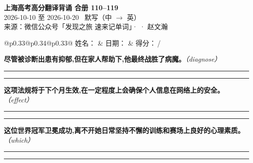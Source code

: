 \documentclass[11pt,a4paper]{article}
\newcommand{\num}[1]{\makebox[1.9em][r]{#1.}\hspace{0.3em}}
\newcommand{\wline}{\noindent\rule{\linewidth}{0.4pt}}
\newcommand{\prompt}[1]{\emph{\textcolor{tipblue}{\small（#1）}}}
\begin{document}
\pagestyle{plain}
\begin{center}
{\LARGE\bfseries 上海高考高分翻译背诵 \quad 合册 110–119}\\[0.25em]
{\large 2026-10-10 至 2026-10-20 \quad\ 默写（中 $\to$ 英）}\\[0.35em]
{\footnotesize 来源：微信公众号「发现之旅 速来记单词」·  · 赵文瀚}
\end{center}

\vspace{0.4em}
\noindent\begin{tabular}{@{}p{0.33\textwidth}@{}p{0.34\textwidth}@{}p{0.33\textwidth}@{}}
姓名：\underline{\hspace{2.0cm}} & 日期：\underline{\hspace{2.0cm}} & 得分：\underline{\hspace{1.4cm}}\,/ \\
\end{tabular}

\vspace{0.5em}

\vspace{0.8em}
\vspace{0.35em}\vspace{0.15em}

\begin{minipage}{\linewidth}

\num{1}\textbf{尽管被诊断出患有抑郁,但在家人帮助下,他最终战胜了病魔。}\prompt{diagnose}

\vspace{0.3em}

\wline\vspace{0.3em}
\wline

\end{minipage}

\begin{minipage}{\linewidth}

\num{2}\textbf{这项法规将于下个月生效,在一定程度上会确保个人信息在网络上的安全。}\prompt{effect}

\vspace{0.3em}

\wline\vspace{0.3em}
\wline

\end{minipage}

\begin{minipage}{\linewidth}

\num{3}\textbf{这位世界冠军卫冕成功,离不开她日常坚持不懈的训练和赛场上良好的心理素质。}\prompt{which}

\vspace{0.3em}

\wline\vspace{0.3em}
\wline

\end{minipage}
\end{document}
